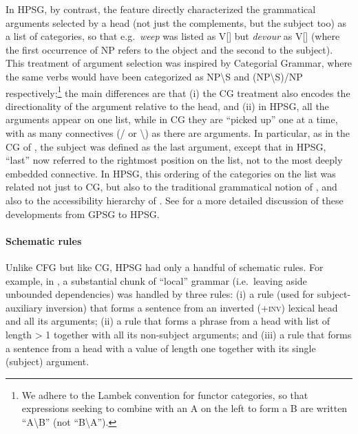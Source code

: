 \documentclass[output=paper,biblatex,babelshorthands,newtxmath,draftmode,colorlinks,citecolor=brown]{langscibook}
\begin{document}
\noindent
In HPSG, by contrast, the
\subcat feature directly characterized the grammatical arguments selected by a head (not just the
complements, but the subject too) as a list of categories, so that e.g.~\emph{weep} was listed as
V[\subcat {}] but \emph{devour} as V[\subcat {}] (where the first occurrence of NP refers to the object and the second to the subject). This treatment of argument selection was inspired by Categorial Grammar, where the same verbs would have been categorized as NP{\textbackslash}S and (NP{\textbackslash}S)/NP respectively;\footnote{We adhere to the Lambek convention for functor categories, so that expressions seeking to combine with an A on the left to form a B are written ``A{\textbackslash}B'' (not ``B{\textbackslash}A'').} the main differences are that (i) the CG treatment also encodes the directionality of the argument relative to the head, and (ii) in HPSG, all the arguments appear on one list, while in CG they are ``picked up'' one at a time, with as many
connectives (/ or \textbackslash) as there are arguments. In particular, as in the CG of \citet{Dowty82b}, the subject was defined as the last argument, except that in HPSG, ``last'' now referred to the rightmost position on the \subcat list, not to the most deeply embedded connective. In HPSG, this
ordering of the categories on the \subcat list was related not just to CG, but also to the traditional grammatical notion of , and also to the accessibility hierarchy of \citet{KC77a}.  See \citet[Section 4]{MWArgSt} for a more detailed discussion of these developments from GPSG to HPSG.\label{page-subcategorization-end}

\paragraph*{Schematic rules} Unlike CFG but like CG, HPSG had only a handful of schematic rules. For example, in \citet{Pollard85a-u}, a substantial chunk of  ``local'' grammar (i.e.~leaving aside unbounded dependencies) was handled by three rules: (i) a rule (used for subject-auxiliary inversion) that forms a sentence from an inverted (+\textsc{inv}) lexical head and all its arguments; (ii) a rule that forms a phrase from a head with \subcat list of length > 1 together with all its non-subject arguments; and (iii) a rule that forms a sentence from a head with a \subcat value of length one together with its single (subject) argument.
\end{document}
